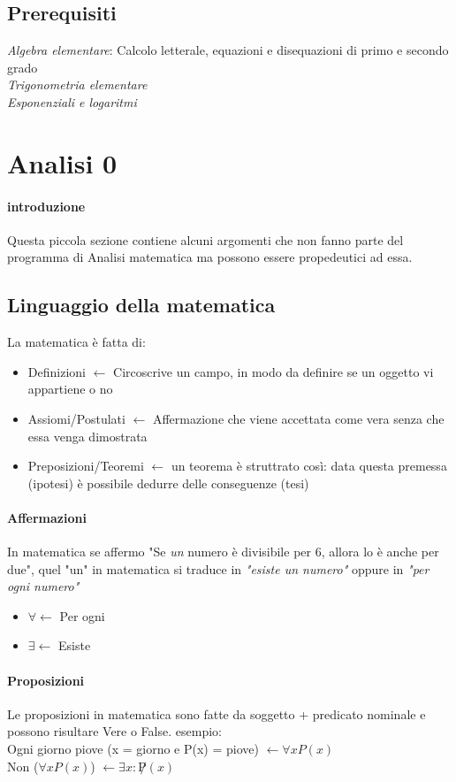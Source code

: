 \documentclass[12pt, a4paper, openany]{book}
\begin{document}
\subsection*{Prerequisiti}
\emph{Algebra elementare}: Calcolo letterale, equazioni e disequazioni di primo e secondo grado
\\\emph{Trigonometria elementare}
\\\emph{Esponenziali e logaritmi}

\section{Analisi 0}
\paragraph{introduzione}
Questa piccola sezione contiene alcuni argomenti che non fanno parte del programma di Analisi matematica ma possono essere propedeutici ad essa.
\subsection*{Linguaggio della matematica }
La matematica è fatta di:
\begin{itemize}
    \item Definizioni $\leftarrow$ Circoscrive un campo, in modo da definire se un oggetto vi appartiene o no
    \item Assiomi/Postulati $\leftarrow$  Affermazione che viene accettata come vera senza che essa venga dimostrata
    \item Preposizioni/Teoremi $\leftarrow$  un teorema è struttrato così: data questa premessa (ipotesi) è possibile dedurre delle conseguenze (tesi)
\end{itemize}
\paragraph*{Affermazioni} In matematica se affermo "Se \emph{un} numero è divisibile per 6, allora lo è anche per due", quel "un" in matematica si traduce in \emph{"esiste un numero"} oppure in \emph{"per ogni numero"} 
\begin{itemize}
    \item $\forall \leftarrow$ Per ogni
    \item $\exists \leftarrow$ Esiste
\end{itemize}

\paragraph*{Proposizioni}
Le proposizioni in matematica sono fatte da soggetto + predicato nominale e possono risultare Vere o False.
esempio: 
\\Ogni giorno piove (x = giorno e P(x) = piove) $\leftarrow \forall x P(x)$
\\Non ($\forall x P(x)$) $\leftarrow \exists x : \not P(x)$
\end{document}
